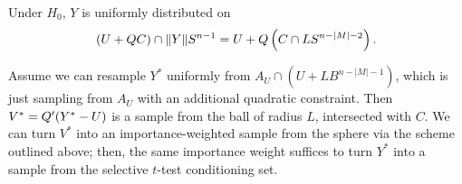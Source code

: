 \documentclass{article}
\theoremstyle{definition}
\begin{document}
\begin{appendix}
Under $H_0$, $Y$ is uniformly distributed on \begin{equation}
  (U+{Q} C)\cap \|Y\| S^{n-1} = U+{Q} \left(C \cap L S^{n-|M|-2}\right).
\end{equation}

Assume we can resample $Y^*$ uniformly from $A_U \cap (U + LB^{n-|M|-1})$, which is just sampling from $A_U$ with an additional quadratic constraint. Then $V^* = {Q}' (Y^*-U)$ is a sample from the ball of radius $L$, intersected with $C$. We can turn $V^*$ into an importance-weighted sample from the sphere via the scheme outlined above; then, the same importance weight suffices to turn $Y^*$ into a sample from the selective $t$-test conditioning set.




\end{appendix}
\end{document}
